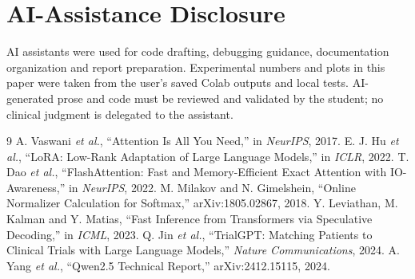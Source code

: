 \documentclass[conference]{IEEEtran}
\begin{document}
\section*{AI-Assistance Disclosure}
AI assistants were used for code drafting, debugging guidance, documentation organization and report preparation. Experimental numbers and plots in this paper were taken from the user's saved Colab outputs and local tests. AI-generated prose and code must be reviewed and validated by the student; no clinical judgment is delegated to the assistant.
\begin{thebibliography}{9}
 A. Vaswani \emph{et al.}, ``Attention Is All You Need,'' in \emph{NeurIPS}, 2017.
 E. J. Hu \emph{et al.}, ``LoRA: Low-Rank Adaptation of Large Language Models,'' in \emph{ICLR}, 2022.
 T. Dao \emph{et al.}, ``FlashAttention: Fast and Memory-Efficient Exact Attention with IO-Awareness,'' in \emph{NeurIPS}, 2022.
 M. Milakov and N. Gimelshein, ``Online Normalizer Calculation for Softmax,'' arXiv:1805.02867, 2018.
 Y. Leviathan, M. Kalman and Y. Matias, ``Fast Inference from Transformers via Speculative Decoding,'' in \emph{ICML}, 2023.
 Q. Jin \emph{et al.}, ``TrialGPT: Matching Patients to Clinical Trials with Large Language Models,'' \emph{Nature Communications}, 2024.
 A. Yang \emph{et al.}, ``Qwen2.5 Technical Report,'' arXiv:2412.15115, 2024.
\end{thebibliography}
\end{document}
